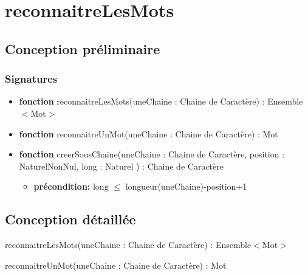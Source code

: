\documentclass{article}
\begin{document}
    \pagestyle{empty}
    \noindent

    \section*{reconnaitreLesMots}
    \subsection*{Conception préliminaire}
    
    \subsubsection*{Signatures}

	\begin{itemize}[label=$\ $, leftmargin=1cm]
		 \item \textbf{fonction} reconnaitreLesMots(uneChaine : Chaine de Caractère) : Ensemble$<$Mot$>$
		 \item \textbf{fonction} reconnaitreUnMot(uneChaine : Chaine de Caractère) : Mot
		 \item \textbf{fonction} creerSousChaine(uneChaine : Chaine de Caractère, position : NaturelNonNul, long : Naturel ) : Chaine de Caractère
		 \begin{itemize}[label=$| $]
            \item \textbf{précondition:} long $\le$ longueur(uneChaine)-position+1
         \end{itemize}
		 
	\end{itemize} 

    \subsection*{Conception détaillée}

        
    \begin{function}
        \SetAlgoLined
        \caption{reconnaitreLesMots(uneChaine : Chaine de Caractère) : Ensemble$<$Mot$>$ }
    \end{function}
    
    \begin{function}
        \SetAlgoLined
        \caption{reconnaitreUnMot(uneChaine : Chaine de Caractère) : Mot}
        \Declaration{}
    \end{function}
    
\end{document}
